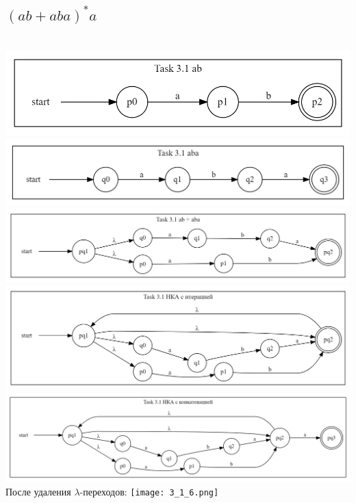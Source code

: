 \documentclass{article}
\begin{document}
\subsection{$ (ab + aba)^*a $}\\ 
\newline\includegraphics[scale=0.4]{3_1_1.png}
\newline\includegraphics[scale=0.4]{3_1_2.png}
\newline\includegraphics[scale=0.4]{3_1_3.png} 
\newline\includegraphics[scale=0.4]{3_1_4.png} 
\newline\includegraphics[scale=0.4]{3_1_5.png}
После удаления $\lambda$-переходов:
\newline\texttt{[image: 3\_1\_6.png]}
\end{document}
